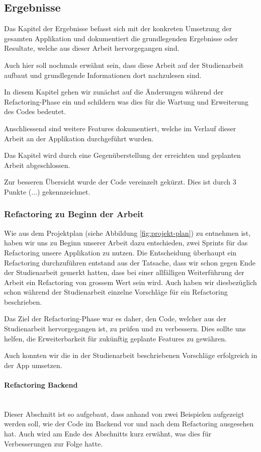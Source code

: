 \subsection{Ergebnisse}
Das Kapitel der Ergebnisse befasst sich mit der konkreten Umsetzung der gesamten Applikation und dokumentiert die grundlegenden Ergebnisse oder Resultate, welche aus dieser Arbeit hervorgegangen sind. 

Auch hier soll nochmals erwähnt sein, dass diese Arbeit auf der Studienarbeit \cite{methode635-sa} aufbaut und grundlegende Informationen dort nachzulesen sind. 

In diesem Kapitel gehen wir zunächst auf die Änderungen während der Refactoring-Phase ein und schildern was dies für die Wartung und Erweiterung des Codes bedeutet. 

Anschliessend sind weitere Features dokumentiert, welche im Verlauf dieser Arbeit an der Applikation durchgeführt wurden.

Das Kapitel wird durch eine Gegenüberstellung der erreichten und geplanten Arbeit abgeschlossen.

Zur besseren Übersicht wurde der Code vereinzelt gekürzt. Dies ist durch 3 Punkte (...) gekennzeichnet.

\subsubsection{Refactoring zu Beginn der Arbeit}
Wie aus dem Projektplan (siehe Abbildung \ref{fig:projekt-plan}) zu entnehmen ist, haben wir uns zu Beginn unserer Arbeit dazu entschieden, zwei Sprints für das Refactoring unsere Applikation zu nutzen. Die Entscheidung überhaupt ein Refactoring durchzuführen entstand aus der Tatsache, dass wir schon gegen Ende der Studienarbeit gemerkt hatten, dass bei einer allfälligen Weiterführung der Arbeit ein Refactoring von grossem Wert sein wird. Auch haben wir diesbezüglich schon während der Studienarbeit einzelne Vorschläge für ein Refactoring beschrieben.


Das Ziel der Refactoring-Phase war es daher, den Code, welcher aus der Studienarbeit hervorgegangen ist, zu prüfen und zu verbessern. Dies sollte uns helfen, die Erweiterbarkeit für zukünftig geplante Features zu gewähren.

Auch konnten wir die in der Studienarbeit beschriebenen Vorschläge erfolgreich in der App umsetzen.
 
\paragraph*{Refactoring Backend}~\\
Dieser Abschnitt ist so aufgebaut, dass anhand von zwei Beispielen aufgezeigt werden soll, wie der Code im Backend vor und nach dem Refactoring ausgesehen hat. Auch wird am Ende des Abschnitts kurz erwähnt, was dies für Verbesserungen zur Folge hatte.

